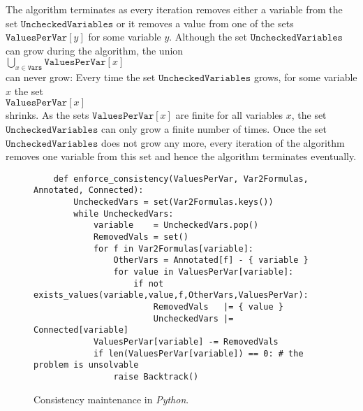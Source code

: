 The algorithm terminates as every iteration removes either a variable from the set
$\texttt{UncheckedVariables}$ or it removes a value from one of the sets $\texttt{ValuesPerVar}[y]$ for some
variable $y$.  Although the set $\texttt{UncheckedVariables}$ can grow during the algorithm,  the union
\\[0.2cm]
\hspace*{1.3cm}
$\bigcup\limits_{x \in \texttt{Vars}} \texttt{ValuesPerVar}[x]$ 
\\[0.2cm]
can never grow:  Every time the set $\texttt{UncheckedVariables}$ grows,
for some variable $x$ the set
\\[0.2cm]
\hspace*{1.3cm}
$\texttt{ValuesPerVar}[x]$ 
\\[0.2cm] 
shrinks.  As the sets $\texttt{ValuesPerVar}[x]$ are finite for all variables $x$, the set
$\texttt{UncheckedVariables}$ can only grow a finite number of times. 
Once the set $\texttt{UncheckedVariables}$ does not grow any more, every iteration of the algorithm removes one
variable from this set and hence the algorithm terminates eventually.

\begin{figure}[!ht]
\centering
\begin{verbatim}
    def enforce_consistency(ValuesPerVar, Var2Formulas, Annotated, Connected):
        UncheckedVars = set(Var2Formulas.keys())
        while UncheckedVars:
            variable    = UncheckedVars.pop()
            RemovedVals = set()
            for f in Var2Formulas[variable]:
                OtherVars = Annotated[f] - { variable }
                for value in ValuesPerVar[variable]:
                    if not exists_values(variable,value,f,OtherVars,ValuesPerVar):
                        RemovedVals   |= { value }
                        UncheckedVars |= Connected[variable]
            ValuesPerVar[variable] -= RemovedVals
            if len(ValuesPerVar[variable]) == 0: # the problem is unsolvable
                raise Backtrack()
\end{verbatim}
\vspace*{-0.3cm}
\caption{Consistency maintenance in \textsl{Python}.}
\label{fig:Consistency-Solver.ipynb:enforce_consistency}
\end{figure}

